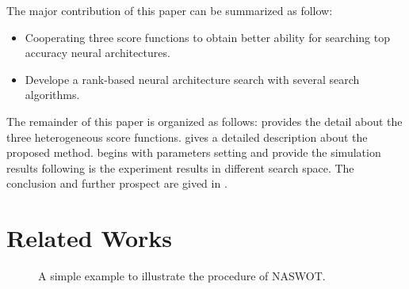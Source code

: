 \documentclass[sigconf]{acmart}
\begin{document}
    The major contribution of this paper can be summarized as follow:
    \begin{itemize}
        \item Cooperating three score functions to obtain better ability for searching top accuracy neural architectures. 
        \item Develope a rank-based neural architecture search with several search algorithms. 
    \end{itemize}

    The remainder of this paper is organized as follows:  provides the 
    detail about the three heterogeneous score functions.  gives a detailed 
    description about the proposed method.  begins with parameters setting and 
    provide the simulation results following is the experiment results in different search space. 
    The conclusion and further prospect are gived in .

    \section{Related Works}
    \label{sec:related_work}
    \begin{figure*}[htb]
        \vspace{-\baselineskip}
        \caption{A simple example to illustrate the procedure of NASWOT.}
        \label{fig:naswot}
        \centering
        \vspace{-\baselineskip}
    \end{figure*}
\end{document}
